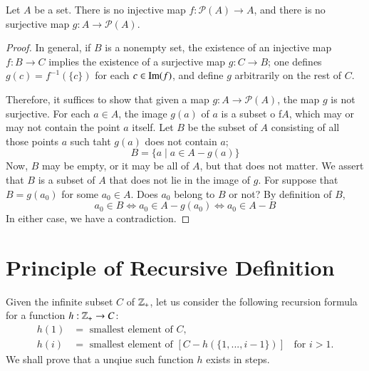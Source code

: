 \documentclass[12pt, a4paper, oneside, openright, titlepage]{book}
\begin{document}
\begin{appendices}
    \begin{theorem}
        Let $A$ be a set. There is no injective map $f:\mathscr{P}(A)\rightarrow A$, and there is no surjective map $g:A\rightarrow \mathscr{P}(A)$. 
    \end{theorem}
    \begin{proof}
        In general, if $B$ is a nonempty set, the existence of an injective map $f:B\rightarrow C$ implies the existence of a surjective map $g:C\rightarrow B$; one defines $g(c) = f^{-1}(\{c\})$ for each $c \in \operatorname{Im}(f)$, and define $g$ arbitrarily on the rest of $C$.

        Therefore, it suffices to show that given a map $g:A\rightarrow \mathscr{P}(A)$, the map $g$ is not surjective. For each $a \in A$, the image $g(a)$ of $a$ is a subset o f$A$, which may or may not contain the point $a$ itself. Let $B$ be the subset of $A$ consisting of all those points $a$ such taht $g(a)$ does not contain $a$; \begin{equation*}
            B=\{a\;\vert\;a\in A-g(a)\}
        \end{equation*}
        Now, $B$ may be empty, or it may be all of $A$, but that does not matter. We assert that $B$ is a subset of $A$ that does not lie in the image of $g$. For suppose that $B = g(a_0)$ for some $a_0 \in A$. Does $a_0$ belong to $B$ or not? By definition of $B$, \begin{equation*}
            a_0 \in B \iff a_0 \in A-g(a_0) \iff a_0 \in A-B
        \end{equation*}
        In either case, we have a contradiction.
    \end{proof}
    

    \section{Principle of Recursive Definition}

    \begin{remark}
        Given the infinite subset $C$ of $\mathbb Z_+$, let us consider the following recursion formula for a function $h:\mathbb Z_+\rightarrow C$:\begin{equation*}
            \begin{array}{cl} h(1) &= \text{ smallest element of $C$}, \\
            h(i) &= \text{ smallest element of } [C-h(\{1,...,i-1\})]\;\;\text{ for } i > 1.
            \end{array} \tag{$(\star)$}
        \end{equation*}
        We shall prove that a unqiue such function $h$ exists in steps.
    \end{remark}


\end{appendices}
\end{document}
